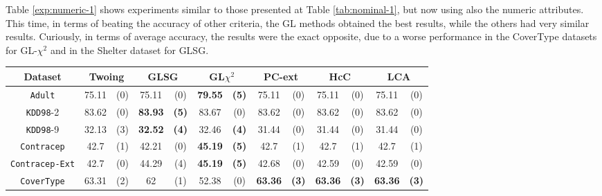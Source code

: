 Table \ref{exp:numeric-1} shows experiments  similar to those presented at Table \ref{tab:nominal-1}, but now
using also the numeric attributes. This time, in terms of beating the accuracy of other criteria, the GL methods obtained the best results, while the others had very similar results. Curiously, in terms of average accuracy, the results were the exact opposite, due to a worse performance in the CoverType datasets for GL-$\chi^ 2$ and in the Shelter dataset for GLSG.

\begin{table}
\scriptsize
\centering
\begin{tabular}{c|cc|cc|cc|cc|cc|cc} 
Dataset            &\multicolumn{2}{c|}{Twoing} & \multicolumn{2}{c|}{GLSG} & \multicolumn{2}{c|}{GL$\chi^2$} & \multicolumn{2}{c|}{PC-ext}& \multicolumn{2}{c|}{HcC}& \multicolumn{2}{c}{LCA}\\
\hline   
{\tt Adult}        & 75.11          &  (0)      & 75.11      & (0)          & {\bf 79.55} &  {\bf (5)}        & 75.11       &  (0)         & 75.11       &  (0)     & 75.11       & (0)       \\
{\tt KDD98}-2      & 83.62          &  (0)      & {\bf 83.93}& {\bf (5)}    & 83.67       &  (0)              & 83.62       &  (0)         & 83.62       &  (0)     & 83.62       & (0)       \\ 
{\tt KDD98}-9      & 32.13          &  (3)      &{\bf 32.52} & {\bf (4)}    & 32.46       &  {\bf (4)}        & 31.44       &  (0)         & 31.44       &  (0)     & 31.44       & (0)       \\ 
{\tt Contracep}    & 42.7           &  (1)      & 42.21      & (0)          & {\bf 45.19} &  {\bf (5)}        & 42.7        &  (1)         & 42.7        &  (1)     & 42.7        & (1)       \\  
{\tt Contracep-Ext}& 42.7           &  (0)      & 44.29      & (4)          & {\bf 45.19} &  {\bf (5)}        & 42.68       &  (0)         & 42.59       &  (0)     & 42.59       & (0)       \\ 
{\tt CoverType}    & 63.31          &  (2)      & 62         & (1)          & 52.38       &  (0)              & {\bf 63.36} &  {\bf (3)}   & {\bf 63.36} & {\bf (3)}& {\bf 63.36} & {\bf (3)} \\  

\end{tabular}
\end{table}
